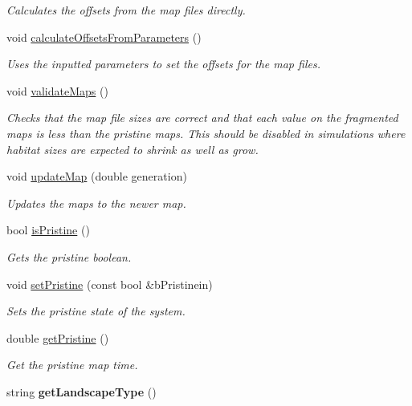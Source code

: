 \begin{DoxyCompactItemize}
\begin{DoxyCompactList}\small\item\em Calculates the offsets from the map files directly. \end{DoxyCompactList}\item 
void \hyperlink{class_landscape_a739549f09fbfbc36674e1a27ad8e9363}{calculate\+Offsets\+From\+Parameters} ()\hypertarget{class_landscape_a739549f09fbfbc36674e1a27ad8e9363}{}\label{class_landscape_a739549f09fbfbc36674e1a27ad8e9363}

\begin{DoxyCompactList}\small\item\em Uses the inputted parameters to set the offsets for the map files. \end{DoxyCompactList}\item 
void \hyperlink{class_landscape_a9181afc2546082c9d4798e16e033b0f1}{validate\+Maps} ()\hypertarget{class_landscape_a9181afc2546082c9d4798e16e033b0f1}{}\label{class_landscape_a9181afc2546082c9d4798e16e033b0f1}

\begin{DoxyCompactList}\small\item\em Checks that the map file sizes are correct and that each value on the fragmented maps is less than the pristine maps. This should be disabled in simulations where habitat sizes are expected to shrink as well as grow. \end{DoxyCompactList}\item 
void \hyperlink{class_landscape_aa96c5208ad89b2e620b52f80b0937dff}{update\+Map} (double generation)\hypertarget{class_landscape_aa96c5208ad89b2e620b52f80b0937dff}{}\label{class_landscape_aa96c5208ad89b2e620b52f80b0937dff}

\begin{DoxyCompactList}\small\item\em Updates the maps to the newer map. \end{DoxyCompactList}\item 
bool \hyperlink{class_landscape_a264624ebb17fe757f4e7c9e082592b79}{is\+Pristine} ()
\begin{DoxyCompactList}\small\item\em Gets the pristine boolean. \end{DoxyCompactList}\item 
void \hyperlink{class_landscape_a04efbb8d2470b1c4990694f0b92e3476}{set\+Pristine} (const bool \&b\+Pristinein)
\begin{DoxyCompactList}\small\item\em Sets the pristine state of the system. \end{DoxyCompactList}\item 
double \hyperlink{class_landscape_af76f7e71318f9ef5cac060de7351fdbc}{get\+Pristine} ()
\begin{DoxyCompactList}\small\item\em Get the pristine map time. \end{DoxyCompactList}\item 
string {\bfseries get\+Landscape\+Type} ()\hypertarget{class_landscape_a5dec397270e8278478f807660e43d565}{}\label{class_landscape_a5dec397270e8278478f807660e43d565}


\end{DoxyCompactItemize}

